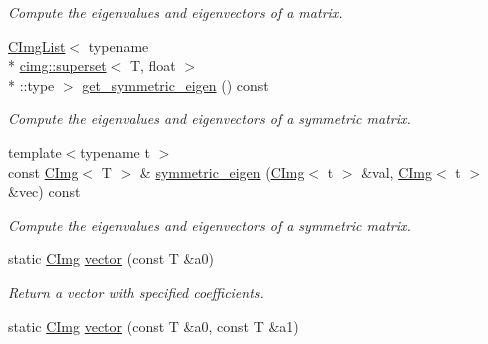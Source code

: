 \begin{DoxyCompactItemize}
\begin{DoxyCompactList}\small\item\em Compute the eigenvalues and eigenvectors of a matrix. \end{DoxyCompactList}\item 
\hypertarget{structcimg__library_1_1_c_img_af6c9c42e0e90bb8cd5f07cc00f8b0f78}{\hyperlink{structcimg__library_1_1_c_img_list}{C\-Img\-List}$<$ typename \\*
\hyperlink{structcimg__library_1_1cimg_1_1superset}{cimg\-::superset}$<$ T, float $>$\\*
\-::type $>$ \hyperlink{structcimg__library_1_1_c_img_af6c9c42e0e90bb8cd5f07cc00f8b0f78}{get\-\_\-symmetric\-\_\-eigen} () const }\label{structcimg__library_1_1_c_img_af6c9c42e0e90bb8cd5f07cc00f8b0f78}

\begin{DoxyCompactList}\small\item\em Compute the eigenvalues and eigenvectors of a symmetric matrix. \end{DoxyCompactList}\item 
\hypertarget{structcimg__library_1_1_c_img_a158737b545ec3cf4870892f94aa0d417}{{\footnotesize template$<$typename t $>$ }\\const \hyperlink{structcimg__library_1_1_c_img}{C\-Img}$<$ T $>$ \& \hyperlink{structcimg__library_1_1_c_img_a158737b545ec3cf4870892f94aa0d417}{symmetric\-\_\-eigen} (\hyperlink{structcimg__library_1_1_c_img}{C\-Img}$<$ t $>$ \&val, \hyperlink{structcimg__library_1_1_c_img}{C\-Img}$<$ t $>$ \&vec) const }\label{structcimg__library_1_1_c_img_a158737b545ec3cf4870892f94aa0d417}

\begin{DoxyCompactList}\small\item\em Compute the eigenvalues and eigenvectors of a symmetric matrix. \end{DoxyCompactList}\item 
\hypertarget{structcimg__library_1_1_c_img_ab863efd16693de8ebc3300b0102f0378}{static \hyperlink{structcimg__library_1_1_c_img}{C\-Img} \hyperlink{structcimg__library_1_1_c_img_ab863efd16693de8ebc3300b0102f0378}{vector} (const T \&a0)}\label{structcimg__library_1_1_c_img_ab863efd16693de8ebc3300b0102f0378}

\begin{DoxyCompactList}\small\item\em Return a vector with specified coefficients. \end{DoxyCompactList}\item 
\hypertarget{structcimg__library_1_1_c_img_a80eba5a3c7ff0ddb9256dec82164ccc8}{static \hyperlink{structcimg__library_1_1_c_img}{C\-Img} \hyperlink{structcimg__library_1_1_c_img_a80eba5a3c7ff0ddb9256dec82164ccc8}{vector} (const T \&a0, const T \&a1)}\label{structcimg__library_1_1_c_img_a80eba5a3c7ff0ddb9256dec82164ccc8}


\end{DoxyCompactItemize}
